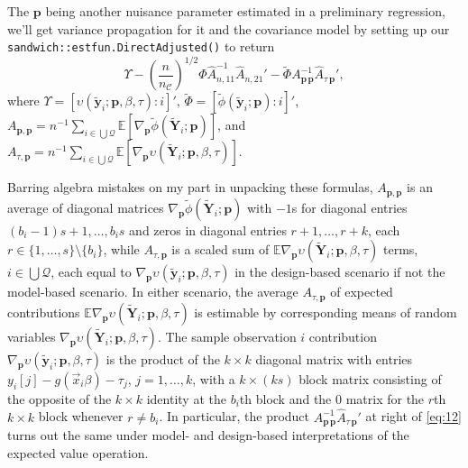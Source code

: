 \documentclass{article}
\begin{document}
The $\mathbf{p}$ being another nuisance parameter estimated in a
preliminary regression, we'll get variance propagation for it and the
covariance model by setting up our
\texttt{sandwich::estfun.DirectAdjusted()} to return
\begin{equation}\label{eq:12}
  \Upsilon -
  \left(\frac{n}{n_{\mathcal{C}}}\right)^{1/2}\Phi
  \hat{A}_{n,11}^{-1}\hat{A}_{n,21}' - \tilde{\Phi}
  A_{\mathbf{p}\,\mathbf{p}}^{-1}\hat{A}_{\tau\,\mathbf{p}}', 
\end{equation}
where $\Upsilon =
[\upsilon(\tilde{\mathbf{y}}_{i}; \mathbf{p}, \beta, \tau) : i]'$,
$\tilde{\Phi}= [\tilde{\phi}(\tilde{\mathbf{y}}_{i}; \mathbf{p}): i]'$, 
$A_{\mathbf{p}, \mathbf{p}} = n^{-1}\sum_{i\in \bigcup
  \mathcal{Q}}\mathbb{E} [\nabla_{\mathbf{p}}\tilde{\phi}(\tilde{\mathbf{Y}}_{i};
\mathbf{p})]$, and $A_{\tau, \mathbf{p}} = n^{-1} \sum_{i\in \bigcup
  \mathcal{Q}}\mathbb{E}[\nabla_{\mathbf{p}}\upsilon(\tilde{\mathbf{Y}}_{i};
\mathbf{p}, \beta, \tau)]$.

Barring algebra mistakes on my part in unpacking these formulas, $A_{\mathbf{p}, \mathbf{p}}$ is
an average of diagonal matrices $\nabla_{\mathbf{p}}\tilde{\phi}(\tilde{\mathbf{Y}}_{i};
\mathbf{p})$ with $-1$s for diagonal entries $(b_{i}-1)s+1, \ldots,
b_{i}s$ and zeros in diagonal entries $r+1, \ldots, r+k$, each
$r \in \{1, \ldots, s\}\setminus \{b_{i}\}$, while $A_{\tau,
  \mathbf{p}}$ is a scaled sum of $\mathbb{E} \nabla_{\mathbf{p}}\upsilon(\tilde{\mathbf{Y}}_{i};
\mathbf{p}, \beta, \tau)$ terms, $i \in \bigcup \mathcal{Q}$, each equal to $\nabla_{\mathbf{p}}\upsilon(\tilde{\mathbf{y}}_{i};
\mathbf{p}, \beta, \tau)$ in the design-based scenario if not the
model-based scenario.  In either scenario, the average $A_{\tau,
  \mathbf{p}}$ of expected contributions $\mathbb{E} \nabla_{\mathbf{p}}\upsilon(\tilde{\mathbf{Y}}_{i};
\mathbf{p}, \beta, \tau)$ is estimable by corresponding means of
random variables $\nabla_{\mathbf{p}}\upsilon(\tilde{\mathbf{Y}}_{i};
\mathbf{p}, \beta, \tau)$.  The sample observation $i$ contribution $\nabla_{\mathbf{p}}\upsilon(\tilde{\mathbf{y}}_{i};
\mathbf{p}, \beta, \tau)$ is the product of the $k \times k$
diagonal matrix with entries $y_{i}[j] - g(\vec{x}_{i}\beta) -
\tau_{j}$, $j=1, \ldots, k$, with a $k \times (ks)$ block matrix
consisting of the opposite of the $k\times k$ identity at the
$b_{i}$th block and the 0 matrix for the $r$th $k \times k$ block whenever
$r\neq b_{i}$.  In particular, the product
$A_{\mathbf{p}\,\mathbf{p}}^{-1}\hat{A}_{\tau\,\mathbf{p}}'$ at right
of \eqref{eq:12} turns out the same under model- and design-based
interpretations of the expected value operation.
\end{document}
